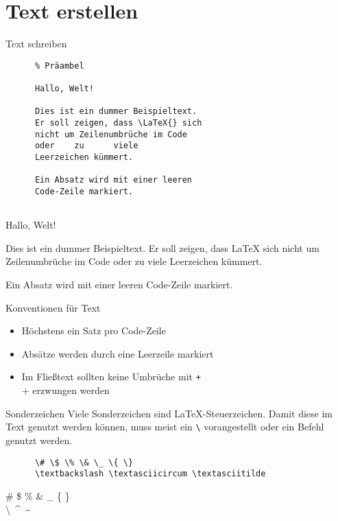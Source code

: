 \section{Text erstellen}

\begin{frame}[fragile]{Text schreiben}
  \begin{CodeExample}{0.5}
    \begin{verbatim}
      % Präambel
      
      Hallo, Welt!
    
      Dies ist ein dummer Beispieltext.
      Er soll zeigen, dass \LaTeX{} sich
      nicht um Zeilenumbrüche im Code
      oder    zu      viele
      Leerzeichen kümmert.
  
      Ein Absatz wird mit einer leeren
      Code-Zeile markiert.  
      
    \end{verbatim}
  \CodeResult
    \strut
    Hallo, Welt!
    
    Dies ist ein dummer Beispieltext.
    Er soll zeigen, dass \LaTeX{} sich
    nicht um Zeilenumbrüche im Code
    oder    zu      viele
    Leerzeichen kümmert.

    Ein Absatz wird mit einer
    leeren Code-Zeile markiert.
  \end{CodeExample}
\end{frame}

\begin{frame}[fragile]{Konventionen für Text}
  \begin{itemize}
    \item Höchstens ein Satz pro Code-Zeile
    \item Absätze werden durch eine Leerzeile markiert
    \item Im Fließtext sollten keine Umbrüche mit \texttt+\\+ erzwungen werden
  \end{itemize}
  \begin{alertblock}{Sonderzeichen}
    Viele Sonderzeichen sind \LaTeX-Steuerzeichen.
    Damit diese im Text genutzt werden können, muss meist ein \verb+\+ vorangestellt oder ein Befehl genutzt werden.
  \end{alertblock}
  \begin{CodeExample}{0.7}
    \begin{verbatim}
      \# \$ \% \& \_ \{ \}
      \textbackslash \textasciicircum \textasciitilde
    \end{verbatim}
  \CodeResult
    \strut
    \# \$ \% \& \_ \{ \} \\
    \textbackslash\ \textasciicircum\ \textasciitilde
  \end{CodeExample}
\end{frame}

